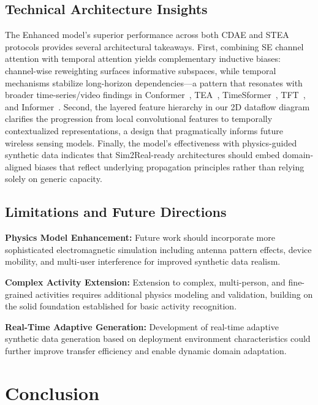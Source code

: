 \documentclass[journal]{IEEEtran}
\begin{document}
\subsection{Technical Architecture Insights}

The Enhanced model's superior performance across both CDAE and STEA protocols provides several architectural takeaways. First, combining SE channel attention with temporal attention yields complementary inductive biases: channel-wise reweighting surfaces informative subspaces, while temporal mechanisms stabilize long-horizon dependencies—a pattern that resonates with broader time-series/video findings in Conformer~\cite{gulati2020conformer}, TEA~\cite{li2020tea}, TimeSformer~\cite{bertasius2021timesformer}, TFT~\cite{lim2021tft}, and Informer~\cite{zhou2021informer}. Second, the layered feature hierarchy in our 2D dataflow diagram clarifies the progression from local convolutional features to temporally contextualized representations, a design that pragmatically informs future wireless sensing models. Finally, the model's effectiveness with physics-guided synthetic data indicates that Sim2Real-ready architectures should embed domain-aligned biases that reflect underlying propagation principles rather than relying solely on generic capacity.

\subsection{Limitations and Future Directions}

\textbf{Physics Model Enhancement:} Future work should incorporate more sophisticated electromagnetic simulation including antenna pattern effects, device mobility, and multi-user interference for improved synthetic data realism.

\textbf{Complex Activity Extension:} Extension to complex, multi-person, and fine-grained activities requires additional physics modeling and validation, building on the solid foundation established for basic activity recognition.

\textbf{Real-Time Adaptive Generation:} Development of real-time adaptive synthetic data generation based on deployment environment characteristics could further improve transfer efficiency and enable dynamic domain adaptation.

\section{Conclusion}
\end{document}
